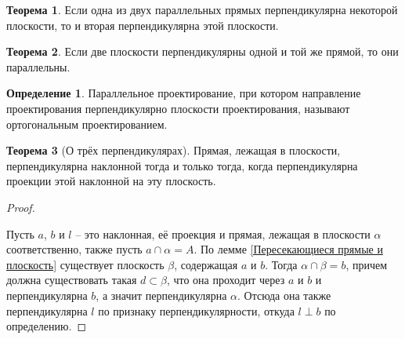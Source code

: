 \documentclass[12pt]{article}
\theoremstyle{definition}
\newtheorem{theorem}{Теорема}[section]
\newtheorem{definition}{Определение}
\begin{document}
    \begin{theorem}
        Если одна из двух параллельных прямых перпендикулярна некоторой плоскости, то и вторая перпендикулярна этой плоскости.
    \end{theorem}
    \begin{theorem}
        Если две плоскости перпендикулярны одной и той же прямой, то они параллельны.
    \end{theorem}
    \begin{definition}
        Параллельное проектирование, при котором направление проектирования перпендикулярно плоскости проектирования, называют ортогональным проектированием.
    \end{definition}
    \begin{theorem}[О трёх перпендикулярах]
        Прямая, лежащая в плоскости, перпендикулярна наклонной тогда и только тогда, когда перпендикулярна проекции этой наклонной на эту плоскость.
    \end{theorem}
    \begin{proof}
        $ $\par\nobreak\ignorespaces
            \begin{center}
            \end{center}
            Пусть $a$, $b$ и $l$ – это наклонная, её проекция и прямая, лежащая в плоскости $\alpha$ соответственно, также пусть $a\cap\alpha=A$. По лемме \ref{Пересекающиеся прямые и плоскость} существует плоскость $\beta$, содержащая $a$ и $b$. Тогда $\alpha\cap\beta=b$, причем должна существовать такая $d\subset\beta$, что она проходит через $a$ и $b$ и перпендикулярна $b$, а значит перпендикулярна $\alpha$. Отсюда она также перпендикулярна $l$ по признаку перпендикулярности, откуда $l\perp b$ по определению.
    \end{proof}
\end{document}
